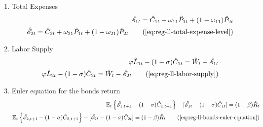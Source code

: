 \documentclass[../thesis.tex]{subfiles}
\begin{document}
{\begin{enumerate}
		
		\begin{comment}
			\item Regional Levels of Consumption and Prices
			\begin{align}
				\hat{C}_{1 1 t} - \hat{C}_{1 2 t} = \hat{P}_{2 t} - \hat{P}_{1 t} \nonumber \\
				\hat{C}_{2 1 t} - \hat{C}_{2 2 t} = \hat{P}_{2 t} - \hat{P}_{1 t} \tag{\ref{eq:reg-ll-regional-consumption-and-prices}}
			\end{align}
		\end{comment}
	

		
		\item Total Expenses
		\begin{align}
			\hat{\mathscr{E}}_{1 t} = \hat{C}_{1 t} + \omega_{1 1} \hat{P}_{1 t} + (1 -\omega_{1 1}) \hat{P}_{2 t} \nonumber \\
			\hat{\mathscr{E}}_{2 t} = \hat{C}_{2 t} + \omega_{2 1} \hat{P}_{1 t} + (1 -\omega_{2 1}) \hat{P}_{2 t} \tag{\ref{eq:reg-ll-total-expense-level}}
		\end{align}
		
		\item Labor Supply
		\begin{alignat}{2}
			\varphi \hat{L}_{1 t} - (1 -\sigma) \hat{C}_{1 t} = \hat{W}_t - \hat{ \mathscr{E} }_{1 t} \nonumber \\
			\varphi \hat{L}_{2 t} - (1 -\sigma) \hat{C}_{2 t} = \hat{W}_t - \hat{ \mathscr{E} }_{2 t} \tag{\ref{eq:reg-ll-labor-supply}}
		\end{alignat}
		
		\item Euler equation for the bonds return
		\begin{alignat}{2}
			\E \left\{ \hat{\mathscr{E}}_{1, t+1} - (1 -\sigma)\hat{C}_{1, t+1} \right\} - [\hat{\mathscr{E}}_{1 t} - (1 -\sigma)\hat{C}_{1 t}] = (1 -\beta) \hat{R}_{t} \nonumber \\ %
			\E \left\{ \hat{\mathscr{E}}_{2, t+1} - (1 -\sigma)\hat{C}_{2, t+1} \right\} - [\hat{\mathscr{E}}_{2 t} - (1 -\sigma)\hat{C}_{2 t}] = (1 -\beta) \hat{R}_{t} \tag{\ref{eq:reg-ll-bonds-euler-equation}} %
		\end{alignat}
		

\end{enumerate}}
\end{document}
